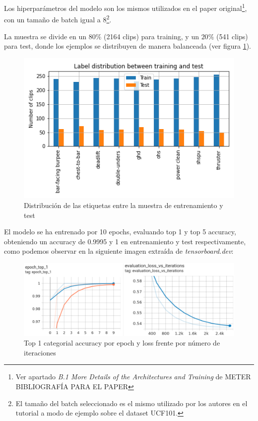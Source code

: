 Los hiperparámetros del modelo son los mismos utilizados en el paper original\footnote{Ver apartado \textit{B.1 More Details of the Architectures and Training} de METER BIBLIOGRAFÍA PARA EL PAPER}, con un tamaño de batch igual a 8\footnote{El tamaño del batch seleccionado es el mismo utilizado por los autores en el tutorial a modo de ejemplo sobre el dataset UCF101.}.

La muestra se divide en un $80\%$ (2164 clips) para training, y un $20\%$ (541 clips) para test, donde los ejemplos se distribuyen de manera balanceada (ver figura \ref{sample_sizes}).

\begin{figure}[H]
    \centering
		\includegraphics[width=\textwidth]{figs/sample_sizes.png}
\caption{Distribución de las etiquetas entre la muestra de entrenamiento y test}\label{sample_sizes}
\end{figure}

El modelo se ha entrenado por 10 epochs, evaluando top 1 y top 5 accuracy, obteniendo un accuracy de 0.9995 y 1 en entrenamiento y test respectivamente, como podemos observar en la siguiente imagen extraída de \textit{tensorboard.dev}:

\begin{figure}[H]
    \centering
		\includegraphics[width=\textwidth]{figs/tensorboard_training.png}
\caption{Top 1 categorial accuracy por epoch y loss frente por número de iteraciones}\label{training}
\end{figure}

